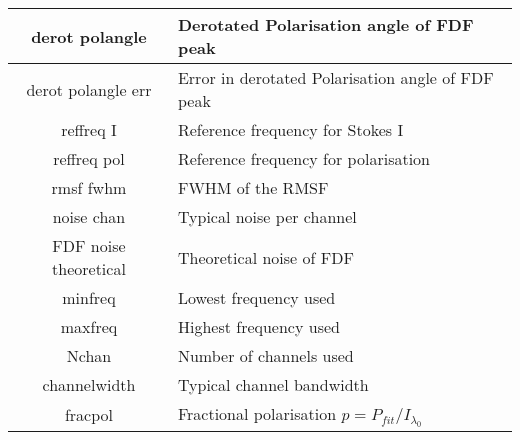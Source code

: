 \begin{center}
\begin{tabular}{||c|p{10cm}||}
\end{tabular}
\end{center}
\begin{center}
\begin{tabular}{||c|p{10cm}||} 
\hline

derot polangle & Derotated Polarisation angle of FDF peak \\
\hline
derot polangle err & Error in derotated Polarisation angle of FDF peak \\
\hline
reffreq I & Reference frequency for Stokes I \\
\hline
reffreq pol & Reference frequency for polarisation \\
\hline
rmsf fwhm & FWHM of the RMSF \\
\hline
noise chan & Typical noise per channel \\
\hline
FDF noise theoretical & Theoretical noise of FDF \\
\hline
minfreq & Lowest frequency used \\
\hline
maxfreq & Highest frequency used \\
\hline
Nchan & Number of channels used \\
\hline
channelwidth & Typical channel bandwidth \\
\hline
fracpol & Fractional polarisation $p=P_{fit}/I_{\lambda_0}$ \\
\hline



\end{tabular}
\end{center}
